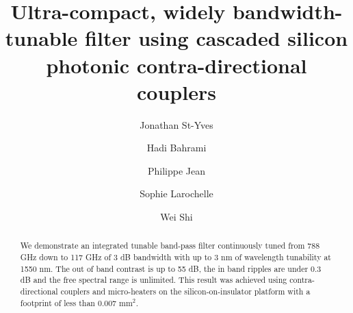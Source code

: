 \documentclass[osajnl,twocolumn,showpacs,superscriptaddress,10pt]{revtex4-1}
\begin{document}
\title{Ultra-compact, widely bandwidth-tunable filter using cascaded silicon photonic contra-directional couplers}

\author{Jonathan St-Yves} 
\author{Hadi Bahrami}
\author{Philippe Jean}
\author{Sophie Larochelle}
\author{Wei Shi}


\begin{abstract}


We demonstrate an integrated tunable band-pass filter continuously tuned from 788 GHz down to 117 GHz of 3 dB bandwidth with up to 3 nm of wavelength tunability at 1550 nm. The out of band contrast is up to 55 dB, the in band ripples are under 0.3 dB and the free spectral range is unlimited. This result was achieved using contra-directional couplers and micro-heaters on the silicon-on-insulator platform with a footprint of less than 0.007 mm$^2$.
\end{abstract}



\maketitle

\end{document}
